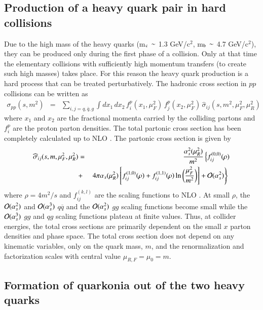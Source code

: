 \subsection{Production of a heavy quark pair in hard collisions}
\label{subsec:HeavyQuarkProd}
Due to the high mass of the heavy quarks (m$_{\rm c}\,\sim$ 1.3 GeV/c$^2$, m$_{\rm b}\,\sim$ 4.7 GeV/c$^2$), 
they can be produced only during the first phase of a collision.
Only at that time the elementary collisions with sufficiently high momentum 
transfers (to create such high masses) takes place. For this reason the heavy quark production
is a hard process that can be treated perturbatively.
The hadronic cross section in $pp$ collisions can
be written as
\begin{eqnarray}
\sigma_{pp}(s,m^2) & = & \sum_{i,j = q, \overline q, g} 
\int dx_1 \, dx_2 \, 
f_i^p (x_1,\mu_F^2) \,
f_j^p(x_2,\mu_F^2) \, \widehat{\sigma}_{ij}(s,m^2,\mu_F^2,\mu_R^2)
\label{sigpp}
\end{eqnarray}
where $x_1$ and $x_2$ are the fractional momenta carried by the colliding
partons and $f_i^p$ are the proton parton densities.
The total partonic cross section has been completely calculated up to NLO
\cite{Nason:1987xz,Nason:1989zy}. The partonic cross section is given by
\begin{eqnarray}
\widehat{\sigma}_{ij}(s,m,\mu_F^2,\mu_R^2) & = & 
\frac{\alpha_s^2(\mu_R^2)}{m^2}
\left\{ f^{(0,0)}_{ij}(\rho) \right. \nonumber \\
 & + & \left. 4\pi \alpha_s(\mu_R^2) \left[f^{(1,0)}_{ij}(\rho) + 
f^{(1,1)}_{ij}(\rho)\ln\bigg(\frac{\mu_F^2}{m^2} \bigg) \right] 
+ {\cal O}(\alpha_s^2) \right\}
\,\, 
\label{sigpart}
\end{eqnarray}
where $\rho = 4m^2/s$ and 
$f_{ij}^{(k,l)}$ are the scaling functions to NLO \cite{Nason:1987xz,Nason:1989zy}. 
At small $\rho$, the ${\cal O}(\alpha_s^2)$ and ${\cal O}(\alpha_s^3)$
$q \overline q$ and the ${\cal O}(\alpha_s^2)$ $gg$ scaling functions 
become small while the ${\cal O}(\alpha_s^3)$ $gg$ and $qg$ scaling functions
plateau at finite values.  Thus, at collider energies, the total cross sections
are primarily dependent on the small $x$ parton densities and phase space.
The total cross section does not depend on any kinematic variables, 
only on the quark mass, $m$, and the renormalization and factorization scales with central
value $\mu_{R,F} =\mu_0 = m$.

\subsection{Formation of quarkonia out of the two heavy quarks}
\label{subsec:QuarkoniaProdFromHeavyQuarks}

